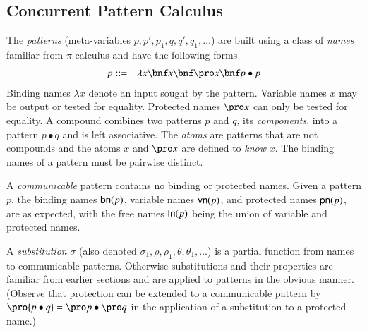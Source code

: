 \documentclass{llncs}
\begin{document}
\subsection{Concurrent Pattern Calculus}
\label{ssec:cpc}


The {\em patterns} (meta-variables $p,p',p_1,q,q',q_1,\ldots$)
are built using a class of {\em names} familiar from $\pi$-calculus and
have the following forms
\begin{eqnarray*}
p &::=& \lambda x \bnf x \bnf \pro x \bnf p\bullet p
\end{eqnarray*}
Binding names $\lambda x$ denote an input sought by the pattern.
Variable names $x$  may be output or tested for equality.
Protected names $\pro x$ can only be tested for equality.
A compound combines two patterns $p$ and $q$, its {\em components}, into a pattern $p\bullet q$ and is left associative.
The {\em atoms} are patterns that are not compounds and the atoms $x$ and $\pro x$ are defined to {\em know} $x$.
The binding names of a pattern must be pairwise distinct.

A {\em communicable} pattern contains no binding or protected names.
Given a pattern $p$, the
binding names ${\sf bn}(p)$,
variable names ${\sf vn}(p)$,
and protected names ${\sf pn}(p)$,
are as expected, with the free names ${\sf fn}(p)$ being the union of variable and protected names.


A {\em substitution} $\sigma$ (also denoted
$\sigma_1,\rho,\rho_1,\theta,\theta_1,\ldots$) is a partial function
from names to communicable patterns.
Otherwise substitutions and their
properties are familiar from earlier sections and are applied to patterns
in the obvious manner.
(Observe that protection can be extended to a communicable pattern by
$\pro {p\bullet q}=\pro p\bullet \pro q$ in the application of a
substitution to a protected name.)
\end{document}
